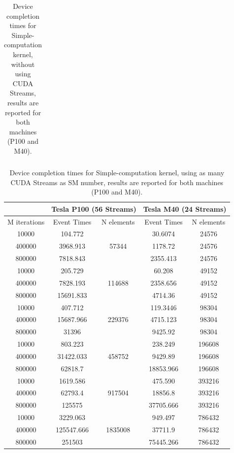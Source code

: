 \begin{table}
\begin{tabular}{ | c ||  c | c  || c | c | }
		\hline
		
		
	\end{tabular}
	\caption{Device completion times for Simple-computation kernel, without using CUDA Streams, results are reported for both machines (P100 and M40).}	
	\label{tab:cosavgszero}		
\end{table}

\begin{table}	
	\centering
	\begin{tabular}{ | c |  c c  | c c | } 
		\hline
		& \multicolumn{2}{c}{\textbf{Tesla P100 (56 Streams)}} & \multicolumn{2}{c}{\textbf{Tesla M40 (24 Streams)}}\\ [0.5ex]
		\hline\hline
		M iterations & Event Times & N elements    &    Event Times & N elements  \\
		\hline
		
		10000 &	104.772& \multirow{3}{*}{57344}& 30.6074& 24576\\
		400000&	3968.913&	&	1178.72	& 24576\\
		800000&	7818.843&	&	2355.413&	24576\\
		\hline
		10000&	205.729&\multirow{3}{*}{114688}& 60.208& 49152\\
		400000&	7828.193&	&	2358.656&	49152\\
		800000&	15691.833&	&	4714.36&	49152\\
		\hline
		10000&	407.712& \multirow{3}{*}{229376}& 119.3446&	98304\\
		400000&	15687.966&	&	4715.123&	98304\\
		800000&	31396&	&	9425.92&	98304\\
		\hline
		10000&	803.223& \multirow{3}{*}{458752}& 238.249&	196608\\
		400000&	31422.033&	&	9429.89&	196608\\
		800000&	62818.7&	&	18853.966&	196608\\
		\hline
		10000&	1619.586& \multirow{3}{*}{917504}&	475.590&	393216\\
		400000&	62793.4&	&	18856.8&	393216\\
		800000&	125575&	&	37705.666&	393216\\
		\hline
		10000&	3229.063& \multirow{3}{*}{1835008}&	949.497 & 786432\\
		400000&	125547.666&	&	37711.9 &	786432\\
		800000&	251503&	&	75445.266&	786432\\
		
		\hline
		
		
	\end{tabular}
	\caption{Device completion times for Simple-computation kernel, using as many CUDA Streams as SM number, results are reported for both machines (P100 and M40).}	
	\label{tab:cosavgsSM}		
\end{table}

